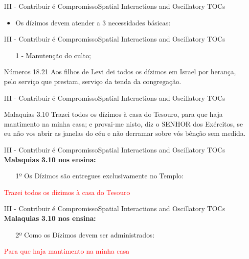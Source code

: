 \documentclass[14pt,aspectratio=169]{beamer}
\newcommand{\TT}{Spatial Interactions and Oscillatory TOCs}
\newcommand{\PIII}{III - Contribuir é Compromisso}
\begin{document}
\begin{frame}{\PIII}{\TT}
 \begin{itemize}
  \item Os dízimos devem atender a 3 necessidades básicas:
 \end{itemize}
\end{frame}

\begin{frame}{\PIII}{\TT}
 \begin{enumerate}
  \item[1 -] Manutenção do culto;\pause
 \end{enumerate}
 \begin{block}{Números 18.21}
 Aos filhos de Levi dei todos os dízimos em Israel por herança, pelo serviço que prestam, serviço da tenda da congregação.
 \end{block}
\end{frame}

\begin{frame}{\PIII}{\TT}
 \begin{block}{Malaquias 3.10}
\Large
Trazei todos os dízimos à casa do Tesouro, para que haja mantimento na minha casa; e provai-me nisto, diz o SENHOR dos Exércitos, se eu não vos abrir as janelas do céu e não derramar sobre vós bênção sem medida.
 \end{block}
\end{frame}

\begin{frame}{\PIII}{\TT}
 \textbf{Malaquias 3.10 nos ensina:}\pause
 \begin{enumerate}
  \item[1º] Os Dízimos são entregues exclusivamente no Templo:\pause
 \end{enumerate}
  \begin{center}
  \textcolor{red}{Trazei todos os dízimos à casa do Tesouro}
  \end{center} 
\end{frame}

\begin{frame}{\PIII}{\TT}
 \textbf{Malaquias 3.10 nos ensina:}
 \begin{enumerate}
  \item[2º] Como os Dízimos devem ser administrados:\pause
 \end{enumerate}
  \begin{center}
  \textcolor{red}{Para que haja mantimento na minha casa}
  \end{center}
\end{frame}
\end{document}
